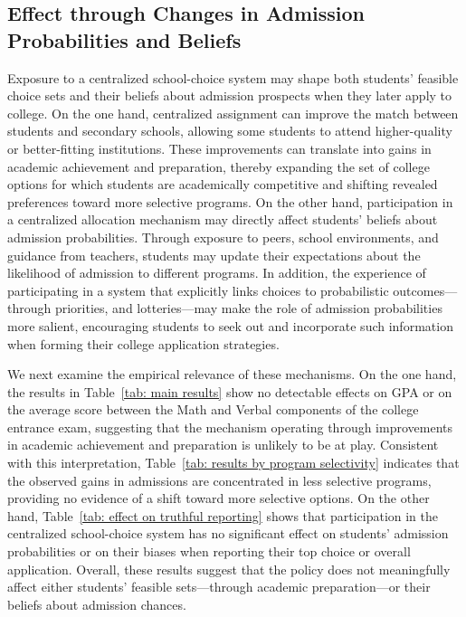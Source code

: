 \subsection{Effect through Changes in Admission Probabilities and Beliefs}
Exposure to a centralized school-choice system may shape both students’ feasible choice sets and their beliefs about admission prospects when they later apply to college. On the one hand, centralized assignment can improve the match between students and secondary schools, allowing some students to attend higher-quality or better-fitting institutions. These improvements can translate into gains in academic achievement and preparation, thereby expanding the set of college options for which students are academically competitive and shifting revealed preferences toward more selective programs. On the other hand, participation in a centralized allocation mechanism may directly affect students' beliefs about admission probabilities. Through exposure to peers, school environments, and guidance from teachers, students may update their expectations about the likelihood of admission to different programs. In addition, the experience of participating in a system that explicitly links choices to probabilistic outcomes—through priorities,  and lotteries—may make the role of admission probabilities more salient, encouraging students to seek out and incorporate such information when forming their college application strategies.

We next examine the empirical relevance of these mechanisms. On the one hand, the results in Table~\ref{tab: main results} show no detectable effects on GPA or on the average score between the Math and Verbal components of the college entrance exam, suggesting that the mechanism operating through improvements in academic achievement and preparation is unlikely to be at play. Consistent with this interpretation, Table~\ref{tab: results by program selectivity} indicates that the observed gains in admissions are concentrated in less selective programs, providing no evidence of a shift toward more selective options.
On the other hand, Table~\ref{tab: effect on truthful reporting} shows that participation in the centralized school-choice system has no significant effect on students’ admission probabilities or on their biases when reporting their top choice or overall application. Overall, these results suggest that the policy does not meaningfully affect either students’ feasible sets—through academic preparation—or their beliefs about admission chances.

